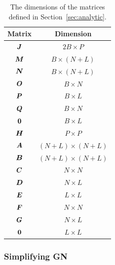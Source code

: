 \documentclass[useAMS,usenatbib]{mn2e}
\newcommand{\bA}{\bmath{A}}
\newcommand{\bB}{\bmath{B}}
\newcommand{\bC}{\bmath{C}}
\newcommand{\bE}{\bmath{E}}
\newcommand{\bF}{\bmath{F}}
\newcommand{\bG}{\bmath{G}}
\newcommand{\bJ}{\bmath{J}}
\newcommand{\bD}{\bmath{D}}
\newcommand{\bH}{\bmath{H}}
\newcommand{\bN}{\bmath{N}}
\newcommand{\bM}{\bmath{M}}
\newcommand{\bO}{\bmath{O}}
\newcommand{\bP}{\bmath{P}}
\newcommand{\bQ}{\bmath{Q}}
\newcommand{\bzero}{\bmath{0}}
\newcommand{\conj}[1]{\overline{#1}}
\begin{document}

\begin{table}
\centering
\caption{The dimensions of the matrices defined in Section~\ref{sec:analytic}.}
\begin{tabular}{|c c|} 
\hline
Matrix & Dimension\\
\hline
\hline
$\bJ$ & $2B \times P$ \\
$\bM$ & $B \times (N+L)$ \\
$\bN$ & $B \times (N+L)$ \\
$\bO$ & $B \times N$ \\
$\bP$ & $B \times L$ \\
$\bQ$ & $B \times N$ \\
$\bzero$ & $B \times L$ \\
\hline
\hline
$\bH$ & $P\times P$\\
$\bA$ & $(N+L)\times (N+L)$\\
$\bB$ & $(N+L)\times (N+L)$\\
$\bC$ & $N \times N$\\
$\bD$ & $N \times L$\\
$\bE$ & $L \times L$\\
$\bF$ & $N \times N$\\
$\bG$ & $N \times L$\\
$\bzero$ & $L \times L$\\
\hline
\end{tabular}
\label{tab:matrix_dimensions}
\end{table}

\subsubsection{Simplifying GN}
\end{document}
